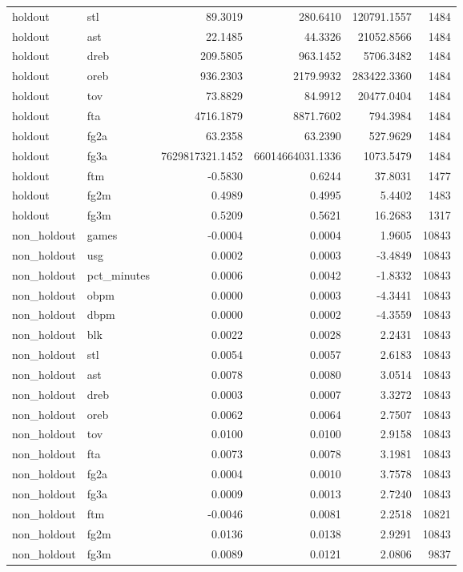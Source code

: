 \begin{table}
\begin{tabular}{llrrrr}
holdout & stl & 89.3019 & 280.6410 & 120791.1557 & 1484 \\
holdout & ast & 22.1485 & 44.3326 & 21052.8566 & 1484 \\
holdout & dreb & 209.5805 & 963.1452 & 5706.3482 & 1484 \\
holdout & oreb & 936.2303 & 2179.9932 & 283422.3360 & 1484 \\
holdout & tov & 73.8829 & 84.9912 & 20477.0404 & 1484 \\
holdout & fta & 4716.1879 & 8871.7602 & 794.3984 & 1484 \\
holdout & fg2a & 63.2358 & 63.2390 & 527.9629 & 1484 \\
holdout & fg3a & 7629817321.1452 & 66014664031.1336 & 1073.5479 & 1484 \\
holdout & ftm & -0.5830 & 0.6244 & 37.8031 & 1477 \\
holdout & fg2m & 0.4989 & 0.4995 & 5.4402 & 1483 \\
holdout & fg3m & 0.5209 & 0.5621 & 16.2683 & 1317 \\
non\_holdout & games & -0.0004 & 0.0004 & 1.9605 & 10843 \\
non\_holdout & usg & 0.0002 & 0.0003 & -3.4849 & 10843 \\
non\_holdout & pct\_minutes & 0.0006 & 0.0042 & -1.8332 & 10843 \\
non\_holdout & obpm & 0.0000 & 0.0003 & -4.3441 & 10843 \\
non\_holdout & dbpm & 0.0000 & 0.0002 & -4.3559 & 10843 \\
non\_holdout & blk & 0.0022 & 0.0028 & 2.2431 & 10843 \\
non\_holdout & stl & 0.0054 & 0.0057 & 2.6183 & 10843 \\
non\_holdout & ast & 0.0078 & 0.0080 & 3.0514 & 10843 \\
non\_holdout & dreb & 0.0003 & 0.0007 & 3.3272 & 10843 \\
non\_holdout & oreb & 0.0062 & 0.0064 & 2.7507 & 10843 \\
non\_holdout & tov & 0.0100 & 0.0100 & 2.9158 & 10843 \\
non\_holdout & fta & 0.0073 & 0.0078 & 3.1981 & 10843 \\
non\_holdout & fg2a & 0.0004 & 0.0010 & 3.7578 & 10843 \\
non\_holdout & fg3a & 0.0009 & 0.0013 & 2.7240 & 10843 \\
non\_holdout & ftm & -0.0046 & 0.0081 & 2.2518 & 10821 \\
non\_holdout & fg2m & 0.0136 & 0.0138 & 2.9291 & 10843 \\
non\_holdout & fg3m & 0.0089 & 0.0121 & 2.0806 & 9837 \\
\bottomrule
\end{tabular}
\end{table}
